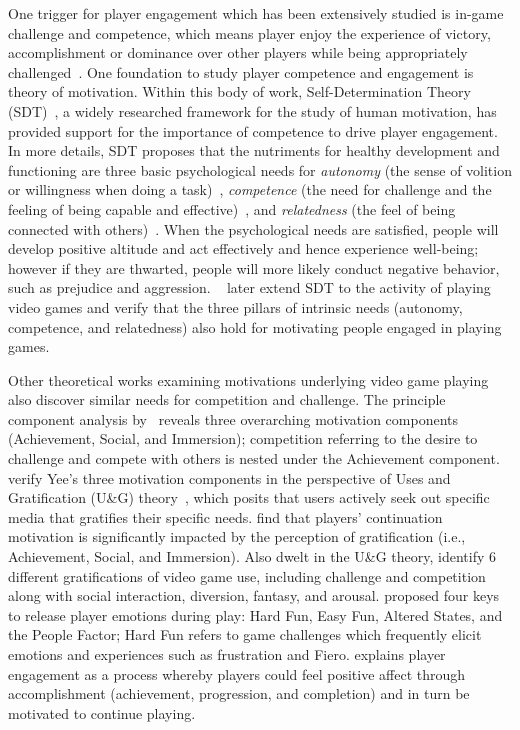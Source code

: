 One trigger for player engagement which has been extensively studied is in-game challenge and competence, which means player enjoy the experience of victory, accomplishment or dominance over other players while being appropriately challenged~\cite{ryan2006motivational,przybylski2010motivational,yee2006motivations,wu2010falling,sherry2006video,lazzaro2004we,schoenau2011player}. One foundation to study player competence and engagement is theory of motivation. Within this body of work, Self-Determination Theory (SDT)~\cite{ryan2000self}, a widely researched framework for the study of human motivation, has provided support for the importance of competence to drive player engagement. In more details, SDT proposes that the nutriments for healthy development and functioning are three basic psychological needs for \textit{autonomy} (the sense of volition or willingness when doing a task)~\cite{deci2000and,deci1964empirical}, \textit{competence} (the need for challenge and the feeling of being capable and effective)~\cite{white1959motivation,deci1985intrinsic}, and \textit{relatedness} (the feel of being connected with others)~\cite{ryan2001happiness,la2000within}. When the psychological needs are satisfied, people will develop positive altitude and act effectively and hence experience well-being; however if they are thwarted, people will more likely conduct negative behavior, such as prejudice and aggression. ~\cite{ryan2006motivational,przybylski2010motivational} later extend SDT to the activity of playing video games and verify that the three pillars of intrinsic needs (autonomy, competence, and relatedness) also hold for motivating people engaged in playing games. 

Other theoretical works examining motivations underlying video game playing also discover similar needs for competition and challenge. The principle component analysis by~\cite{yee2006motivations} reveals three overarching motivation components (Achievement, Social, and Immersion); competition referring to the desire to challenge and compete with others is nested under the Achievement component. \cite{wu2010falling} verify Yee's three motivation components in the perspective of Uses and Gratification (U\&G) theory~\cite{palmgreen1985uses}, which posits that users actively seek out specific media that gratifies their specific needs. \cite{wu2010falling} find that players' continuation motivation is significantly impacted by the perception of gratification (i.e., Achievement, Social, and Immersion). Also dwelt in the U\&G theory, \cite{sherry2006video} identify 6 different gratifications of video game use, including challenge and competition along with social interaction, diversion, fantasy, and arousal. \cite{lazzaro2004we} proposed four keys to release player emotions during play: Hard Fun, Easy Fun, Altered States, and the People Factor; Hard Fun refers to game challenges which frequently elicit emotions and experiences such as frustration and Fiero. \cite{schoenau2011player} explains player engagement as a process whereby players could feel positive affect through accomplishment (achievement, progression, and completion) and in turn be motivated to continue playing.  

